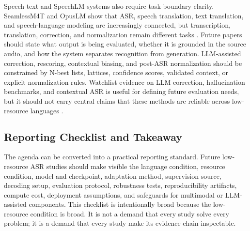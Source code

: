 \documentclass[pdflatex,sn-basic]{sn-jnl}
\theoremstyle{thmstyleone}
\theoremstyle{thmstyletwo}
\theoremstyle{thmstylethree}
\begin{document}
Speech-text and SpeechLM systems also require task-boundary clarity. SeamlessM4T and OpusLM show that ASR, speech translation, text translation, and speech-language modeling are increasingly connected, but transcription, translation, correction, and normalization remain different tasks \citep{seamless2025_joint_speech_text_mt,tian25b_interspeech}. Future papers should state what output is being evaluated, whether it is grounded in the source audio, and how the system separates recognition from generation. LLM-assisted correction, rescoring, contextual biasing, and post-ASR normalization should be constrained by N-best lists, lattices, confidence scores, validated context, or explicit normalization rules. Watchlist evidence on LLM correction, hallucination benchmarks, and contextual ASR is useful for defining future evaluation needs, but it should not carry central claims that these methods are reliable across low-resource languages \citep{ma2024asrerrorcorrection,koudounas2025shallow,wang2025contextasrbench}.

\subsection{Reporting Checklist and Takeaway}

The agenda can be converted into a practical reporting standard. Future low-resource ASR studies should make visible the language condition, resource condition, model and checkpoint, adaptation method, supervision source, decoding setup, evaluation protocol, robustness tests, reproducibility artifacts, compute cost, deployment assumptions, and safeguards for multimodal or LLM-assisted components. This checklist is intentionally broad because the low-resource condition is broad. It is not a demand that every study solve every problem; it is a demand that every study make its evidence chain inspectable.
\end{document}
